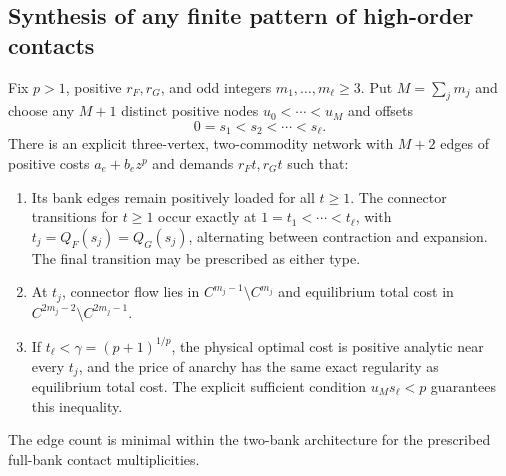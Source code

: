 \subsection{Synthesis of any finite pattern of high-order contacts}

\begin{theorem}\label{mc:synthesis}
Fix $p>1$, positive $r_F,r_G$, and odd integers $m_1,\ldots,m_\ell\ge3$. Put $M=\sum_jm_j$ and choose any $M+1$ distinct positive nodes $u_0<\cdots<u_M$ and offsets
\begin{equation}
 0=s_1<s_2<\cdots<s_\ell.
\end{equation}
There is an explicit three-vertex, two-commodity network with $M+2$ edges of positive costs $a_e+b_ez^p$ and demands $r_Ft,r_Gt$ such that:
\begin{enumerate}[label=(\roman*),nosep]
\item Its bank edges remain positively loaded for all $t\ge1$. The connector transitions for $t\ge1$ occur exactly at $1=t_1<\cdots<t_\ell$, with $t_j=Q_F(s_j)=Q_G(s_j)$, alternating between contraction and expansion. The final transition may be prescribed as either type.
\item At $t_j$, connector flow lies in $C^{m_j-1}\setminus C^{m_j}$ and equilibrium total cost in $C^{2m_j-2}\setminus C^{2m_j-1}$.
\item If $t_\ell<\gamma=(p+1)^{1/p}$, the physical optimal cost is positive analytic near every $t_j$, and the price of anarchy has the same exact regularity as equilibrium total cost. The explicit sufficient condition $u_Ms_\ell<p$ guarantees this inequality.
\end{enumerate}
The edge count is minimal within the two-bank architecture for the prescribed full-bank contact multiplicities.
\end{theorem}
